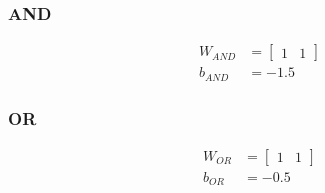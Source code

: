 
\subsubsection{AND}

\begin{align*}
    W_{AND} &=
    \begin{bmatrix}
        1 & 1
    \end{bmatrix}\\
    b_{AND} &= -1.5
\end{align*}

\subsubsection{OR}

\begin{align*}
    W_{OR} &=
    \begin{bmatrix}
        1 & 1
    \end{bmatrix}\\
    b_{OR} &= -0.5
\end{align*}



